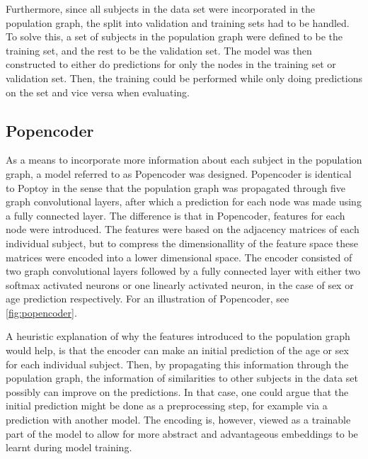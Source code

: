 Furthermore, since all subjects in the data set were incorporated in the population graph, the split into validation and training sets had to be handled. To solve this, a set of subjects in the population graph were defined to be the training set, and the rest to be the validation set. The model was then constructed to either do predictions for only the nodes in the training set or validation set. Then, the training could be performed while only doing predictions on the set and vice versa when evaluating. 




\subsection{Popencoder}
As a means to incorporate more information about each subject in the population graph, a model referred to as Popencoder was designed. Popencoder is identical to Poptoy in the sense that the population graph was propagated through five graph convolutional layers, after which a prediction for each node was made using a fully connected layer. The difference is that in Popencoder, features for each node were introduced. The features were based on the adjacency matrices of each individual subject, but to compress the dimensionallity of the feature space these matrices were encoded into a lower dimensional space. The encoder consisted of two graph convolutional layers followed by a fully connected layer with either two softmax activated neurons or one linearly activated neuron, in the case of sex or age prediction respectively. For an illustration of Popencoder, see \cref{fig:popencoder}.

A heuristic explanation of why the features introduced to the population graph would help, is that the encoder can make an initial prediction of the age or sex for each individual subject. Then, by propagating this information through the population graph, the information of similarities to other subjects in the data set possibly can improve on the predictions. In that case, one could argue that the initial prediction might be done as a preprocessing step, for example via a prediction with another model. The encoding is, however, viewed as a trainable part of the model to allow for more abstract and advantageous embeddings to be learnt during model training. 



